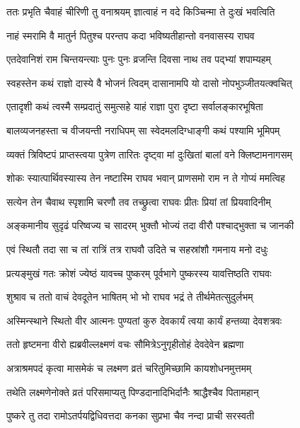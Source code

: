 \twolineshloka
{ततः प्रभृति चैवाहं चीरिणी तु वनाश्रयम्}
{ज्ञात्वाहं न वदे किञ्चिन्मा ते दुःखं भवत्विति} %

\twolineshloka
{नाहं स्मरामि वै मातुर्न पितुश्च परन्तप}
{कदा भविष्यतीहान्तो वनवासस्य राघव} %

\twolineshloka
{एतदेवानिशं राम चिन्तयन्त्याः पुनः पुनः}
{व्रजन्ति दिवसा नाथ तव पद्भ्यां शपाम्यहम्} %

\twolineshloka
{स्वहस्तेन कथं राज्ञो दास्ये वै भोजनं त्विदम्}
{दासानामपि यो दासो नोपभुञ्जीतयत्क्वचित्} %

\twolineshloka
{एतादृशी कथं त्वस्मै सम्प्रदातुं समुत्सहे}
{याहं राज्ञा पुरा दृष्टा सर्वालङ्कारभूषिता} %

\twolineshloka
{बालव्यजनहस्ता च वीजयन्ती नराधिपम्}
{सा स्वेदमलदिग्धाङ्गी कथं पश्यामि भूमिपम्} %

\twolineshloka
{व्यक्तं त्रिविष्टपं प्राप्तस्त्वया पुत्रेण तारितः}
{दृष्ट्वा मां दुःखितां बालां वने क्लिष्टामनागसम्} %

\twolineshloka
{शोकः स्यात्पार्थिवस्यास्य तेन नष्टास्मि राघव}
{भवान् प्राणसमो राम न ते गोप्यं ममत्विह} %

\twolineshloka
{सत्येन तेन चैवाथ स्पृशामि चरणौ तव}
{तच्छ्रुत्वा राघवः प्रीतः प्रियां तां प्रियवादिनीम्} %

\twolineshloka
{अङ्कमानीय सुदृढं परिष्वज्य च सादरम्}
{भुक्तौ भोज्यं तदा वीरौ पश्चाद्भुक्ता च जानकी} %

\twolineshloka
{एवं स्थितौ तदा सा च तां रात्रिं तत्र राघवौ}
{उदिते च सहस्रांशौ गमनाय मनो दधुः} %

\twolineshloka
{प्रत्यङ्मुखं गतः क्रोशं ज्येष्ठं यावच्च पुष्करम्}
{पूर्वभागे पुष्करस्य यावत्तिष्ठति राघवः} %

\twolineshloka
{शुश्राव च ततो वाचं देवदूतेन भाषितम्}
{भो भो राघव भद्रं ते तीर्थमेतत्सुदुर्लभम्} %

\twolineshloka
{अस्मिन्स्थाने स्थितो वीर आत्मनः पुण्यतां कुरु}
{देवकार्यं त्वया कार्यं हन्तव्या देवशत्रवः} %

\twolineshloka
{ततो हृष्टमना वीरो ह्यब्रवील्लक्ष्मणं वचः}
{सौमित्रेऽनुगृहीतोहं देवदेवेन ब्रह्मणा} %

\twolineshloka
{अत्राश्रमपदं कृत्वा मासमेकं च लक्ष्मण}
{व्रतं चरितुमिच्छामि कायशोधनमुत्तमम्} %

\twolineshloka
{तथेति लक्ष्मणेनोक्ते व्रतं परिसमाप्यतु}
{पिण्डदानादिभिर्दानैः श्राद्धैश्चैव पितामहान्} %

\twolineshloka
{पुष्करे तु तदा रामोऽतर्पयद्विधिवत्तदा}
{कनका सुप्रभा चैव नन्दा प्राची सरस्वती} %

